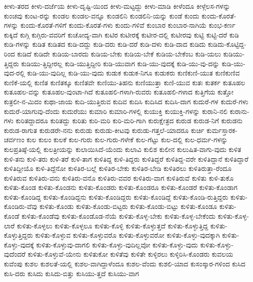 {ಕೀಳು-ತರದ
ಕೀಳು-ದರ್ಜೆಯ
ಕೀಳು-ದೃಷ್ಟಿ-ಯಿಂದ
ಕೀಳು-ಮಟ್ಟದ್ದು
ಕೀಳು-ಮಾಡಿ
ಕೀಳೆಂದೂ
ಕೀಳ್ಗೆಲಸ-ಗಳನ್ನು
ಕುಂಚವು
ಕುಂಟ-ರನ್ನು
ಕುಂಡಲ
ಕುಂಡಲ-ವನ್ನೂ
ಕುಂಡಲಿನಿ
ಕುಂಡಲಿನಿ-ಯನ್ನು
ಕುಂಡೆ
ಕುಂದು
ಕುಂದು-ಕೊರತೆ-ಗಳನ್ನು
ಕುಂದು-ಕೊರತೆ-ಗಳಿಗೆ
ಕುಂದು-ಕೊರತೆ-ಗಳು
ಕುಂದು-ಗಳಿವೆ
ಕುಂಬಾರ
ಕುಂಬಾರ-ನಾಗಿಯೆ
ಕುಂಭ-ಕರ್ಣ
ಕುಕ್ಕಿದೆ
ಕುಗ್ಗಿ
ಕುಗ್ಗಿರು-ವವರಿಗೆ
ಕುಚೋದ್ಯ-ವಾಗಿ
ಕುಟಿರ
ಕುಟೀರಕ್ಕೆ
ಕುಟೀರ-ದಲ್ಲಿ
ಕುಟೀರವು
ಕುಟ್ಟಿ
ಕುಟ್ಟಿ-ದರೆ
ಕುಡಿ
ಕುಡಿ-ಗಳನ್ನು
ಕುಡಿತ
ಕುಡಿತದ
ಕುಡಿ-ದದ್ದು
ಕುಡಿ-ದರು
ಕುಡಿ-ದರೆ
ಕುಡಿ-ದಳು
ಕುಡಿ-ದಾದ
ಕುಡಿದು
ಕುಡಿದು-ಕೊಟ್ಟಿದ್ದ-ರಿಂದ
ಕುಡಿದೆ
ಕುಡಿದೇ
ಕುಡಿಯ-ಬಾರದು
ಕುಡಿಯ-ಬೇಕು
ಕುಡಿಯ-ಬೇಕೆ
ಕುಡಿಯ-ಬೇಕೆಂಬ
ಕುಡಿ-ಯಲು
ಕುಡಿಯು-ತ್ತಿದ್ದರು
ಕುಡಿಯು-ತ್ತಿದ್ದೀರಲ್ಲ
ಕುಡಿ-ಯುತ್ತಿದ್ದೀರಿ
ಕುಡಿ-ಯುವಾಗ
ಕುಡಿ-ಯು-ವುದಕ್ಕೆ
ಕುಡಿ-ಯು-ವು-ದನ್ನು
ಕುಡಿ-ಯು-ವುದ-ರಲ್ಲಿ
ಕುಡಿ-ಯು-ವುದಿಲ್ಲ
ಕುಡಿ-ಯು-ವುದು
ಕುಡುಕ
ಕುಡುಕ-ನಿಗೂ
ಕುಡುಕರು
ಕುಣಿಕುಣಿ-ಯುತ
ಕುಣಿಕುಣಿವ
ಕುಣಿಕೆ-ಯಲ್ಲಿ
ಕುಣಿತ
ಕುಣಿತಕ್ಕೂ
ಕುಣಿತವೇ
ಕುಣಿಯು-ತಿಹನು
ಕುಣಿಯುತ್ತಾ
ಕುಣಿ-ಯುವ
ಕುತಃ
ಕುತರ್ಕ
ಕುತೂಹಲ
ಕುತೂಹಲ-ವನ್ನು
ಕುತೂಹಲ-ವುಂಟಾ-ಗಿದೆ
ಕುತೂಹಲಿ-ಗಳಾಗಿ-ರುವರು
ಕುತೂಹಲಿ-ಗಳಾದ
ಕುತ್ತಿಗೆಯ
ಕುತ್ತೋ
ಕುತ್ರಲೀ-ನ-ಮಿದಂ
ಕುಥಾ-ಜಾಯ
ಕುದಿ-ಯುತ್ತಿರುವ
ಕುದಿವ
ಕುದಿಸಿ
ಕುದಿಸಿದ
ಕುದಿಸಿ-ದಾಗ
ಕುದುರೆ-ಗಳ
ಕುದುರೆ-ಗಳು
ಕುದುರೆ-ಯಾಗುವು-ದೆಂದು
ಕುದುರೆಯು
ಕುಮಾರಿ
ಕುಮಾರಿ-ಗಳಲ್ಲಿ
ಕುಯುಕ್ತಿ
ಕುಯುಕ್ತಿ-ಗಳನ್ನು
ಕುರಾನಿ-ನಲಿ
ಕುರಾನು-ಗಳು
ಕುರಿತದ್ದಾದರೂ
ಕುರಿತದ್ದು
ಕುರಿತು
ಕುರಿ-ಮರಿ
ಕುರಿ-ಮರಿ-ಗಾಗಿ
ಕುರುಕ್ಷೇತ್ರದ
ಕುರುಡ
ಕುರುಡ-ನಿಗೆ
ಕುರುಡನು
ಕುರುಡ-ರಾಗುತ
ಕುರುಡರೇ-ನನು
ಕುರುಡು
ಕುರುಡು-ಕೀಟವು
ಕುರುಡು-ಗತ್ತಲೆ-ಯಾದರೂ
ಕುರ್ಚಿ
ಕುರ್ಮಸ್ತಾರಕ-ಚರ್ವಣಂ
ಕುಲ
ಕುಲಂ
ಕುಲಕೆ
ಕುಲ-ಗುರು
ಕುಲ-ಗುರು-ಗಳೇಕೆ
ಕುಲ-ಗೆಟ್ಟು
ಕುಲ-ದಲ್ಲಿ
ಕುಲ-ಧರ್ಮ-ಗಳನ್ನು
ಕುಲಪ್ರತಿಷ್ಠೆ-ಯಲ್ಲಿ
ಕುಲತ್ರೀಯನ್ನು
ಕುಲಾಯಿಸಿದೆ-ಯೆಂದು
ಕುಲಾವಿ
ಕುಲಿಶ
ಕುಲೀನ
ಕುಲುಷಿತ-ವಾಗು-ವುದು
ಕುಳಿತ
ಕುಳಿ-ತನು
ಕುಳಿ-ತರು
ಕುಳಿ-ತರೆ
ಕುಳಿ-ತಾಗ
ಕುಳಿತಿದ್ದ
ಕುಳಿ-ತಿದ್ದರು
ಕುಳಿತಿದ್ದರೆ
ಕುಳಿತಿದ್ದ-ವರೇ
ಕುಳಿತಿದ್ದಾನೆ
ಕುಳಿತಿದ್ದಾರೆ
ಕುಳಿತಿದ್ದೀಯೊ
ಕುಳಿ-ತಿದ್ದೆನೋ
ಕುಳಿತಿರ-ಬಲ್ಲೆ
ಕುಳಿತಿರ-ಬೇಕು
ಕುಳಿತಿರ-ಬೇಡಿ
ಕುಳಿತಿರಲು
ಕುಳಿತಿರುತ್ತಾ-ರೆಂದೂ
ಕುಳಿತಿರುವ
ಕುಳಿತಿರು-ವನು
ಕುಳಿತಿರು-ವನೊ
ಕುಳಿತಿರು-ವವರ
ಕುಳಿತಿರು-ವಾಗ
ಕುಳಿತಿರುವೆ
ಕುಳಿತು
ಕುಳಿ-ತುಕೊ
ಕುಳಿತು-ಕೊಂಡ
ಕುಳಿತು-ಕೊಂಡನು
ಕುಳಿತು-ಕೊಂಡರು
ಕುಳಿತು-ಕೊಂಡರೂ
ಕುಳಿತು-ಕೊಂಡರೆ
ಕುಳಿತು-ಕೊಂಡಾಗ
ಕುಳಿತು-ಕೊಂಡಿದ್ದ
ಕುಳಿತು-ಕೊಂಡಿದ್ದನು
ಕುಳಿತು-ಕೊಂಡಿದ್ದರು
ಕುಳಿತು-ಕೊಂಡಿದ್ದೆ
ಕುಳಿತು-ಕೊಂಡಿ-ರುತ್ತಿದ್ದರು
ಕುಳಿತು-ಕೊಂಡಿರು-ವೆವು
ಕುಳಿತು-ಕೊಂಡು
ಕುಳಿತು-ಕೊಂಡು-ಬಿಟ್ಟರು
ಕುಳಿತು-ಕೊಂಡು-ಬಿಟ್ಟು
ಕುಳಿತು-ಕೊಂಡೂ
ಕುಳಿತು-ಕೊಂಡೆ
ಕುಳಿತು-ಕೊಂಡೆವು
ಕುಳಿತು-ಕೊಂಡೊಡ-ನೆಯೆ
ಕುಳಿತು-ಕೊಳ್ಳ-ಬೇಕು
ಕುಳಿತು-ಕೊಳ್ಳ-ಬೇಕೆಂದು
ಕುಳಿತು-ಕೊಳ್ಳ-ಲಾರೆ
ಕುಳಿತು-ಕೊಳ್ಳಲು
ಕುಳಿತು-ಕೊಳ್ಳಲೂ
ಕುಳಿತು-ಕೊಳ್ಳಿ
ಕುಳಿತು-ಕೊಳ್ಳುತ್ತದೆ
ಕುಳಿತು-ಕೊಳ್ಳುತ್ತಿದ್ದ
ಕುಳಿತು-ಕೊಳ್ಳುತ್ತಿದ್ದರು
ಕುಳಿತು-ಕೊಳ್ಳುವ
ಕುಳಿತು-ಕೊಳ್ಳುವರೊ
ಕುಳಿತು-ಕೊಳ್ಳುವರೋ
ಕುಳಿತು-ಕೊಳ್ಳು-ವುದಕ್ಕಾಗಿ
ಕುಳಿತು-ಕೊಳ್ಳು-ವುದಕ್ಕೆ
ಕುಳಿತು-ಕೊಳ್ಳುವು-ದಾಗಲಿ
ಕುಳಿತು-ಕೊಳ್ಳು-ವುದಿಲ್ಲವೋ
ಕುಳಿತು-ಕೊಳ್ಳು-ವುದು
ಕುಳಿತು-ಕೊಳ್ಳು-ವುದೆಂದರೆ
ಕುಳಿತು-ಕೊಳ್ಳುವೆ-ಯೇನು
ಕುಳಿತುಕೋ
ಕುಳಿತೆವು
ಕುಳಿತೇ
ಕುಳ್ಳಿರಲು
ಕುಳ್ಳಿರಿಸಿ-ಕೊಂಡರು
ಕುವಲಯ
ಕುವೆಂಪು
ಕುಶಲ
ಕುಶಲತೆ-ಯಲ್ಲಿ
ಕುಶಲ-ವಾಗಿದ್ದಾಳೆಂದೂ
ಕುಶಲ-ವೆಂದು
ಕುಶಲಿ-ಯಾದ
ಕುಸಂಸ್ಕಾರ-ಗಳಿಂದ
ಕುಸಿದ
ಕುಸಿ-ದರು
ಕುಸಿದು
ಕುಸಿದು-ಬಿತ್ತು
ಕುಸಿಯು-ತ್ತದೆ
ಕುಸಿಯು-ವಾಗ
}
